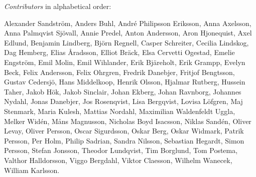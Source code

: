 \emph{Contributors} in alphabetical order:

{\raggedright
{}
\vspace{0.5em}
\noindent

Alexander Sandström,
Anders Buhl,
André Philipsson Eriksson,
Anna Axelsson,
Anna Palmqvist Sjövall,
Annie Predel,
Anton Andersson,
Aron Hjonequist,
Axel Edlund,
Benjamin Lindberg,
Björn Regnell,
Casper Schreiter,
Cecilia Lindskog,
Dag Hemberg,
Elias Åradsson,
Elliot Bräck,
Elsa Cervetti Ogestad,
Emelie Engström,
Emil Molin,
Emil Wihlander,
Erik Bjäreholt,
Erik Grampp,
Evelyn Beck,
Felix Andersson,
Felix Ohrgren,
Fredrik Danebjer,
Fritjof Bengtsson,
Gustav Cedersjö,
Hans Middelkoop,
Henrik Olsson,
Hjalmar Rutberg,
Hussein Taher,
Jakob Hök,
Jakob Sinclair,
Johan Ekberg,
Johan Ravnborg,
Johannes Nydahl,
Jonas Danebjer,
Jos Rosenqvist,
Lisa Bergqvist,
Lovisa Löfgren,
Maj Stenmark,
Maria Kulesh,
Mattias Nordahl,
Maximilian Waldenfeldt Uggla,
Melker Widén,
Måns Magnusson,
Nicholas Boyd Isacsson,
Niklas Sandén,
Oliver Levay,
Oliver Persson,
Oscar Sigurdsson,
Oskar Berg,
Oskar Widmark,
Patrik Persson,
Per Holm,
Philip Sadrian,
Sandra Nilsson,
Sebastian Hegardt,
Simon Persson,
Stefan Jonsson,
Theodor Lundqvist,
Tim Borglund,
Tom Postema,
Valthor Halldorsson,
Viggo Bergdahl,
Viktor Claesson,
Wilhelm Wanecek,
William Karlsson.
\par
}
